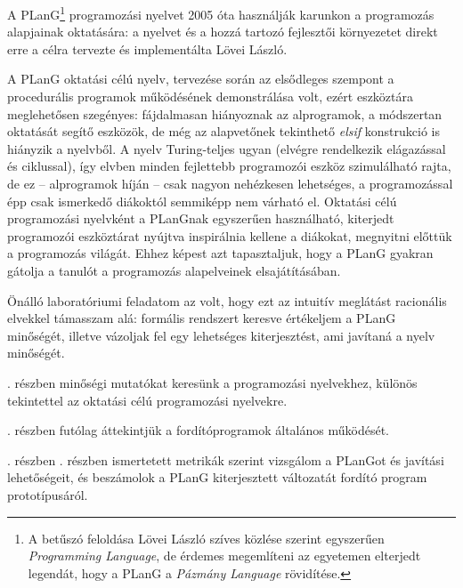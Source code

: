 

A PLanG\footnote{%
	A betűszó feloldása Lövei László szíves közlése szerint egyszerűen \textit{Programming Lan\-guage}, de érdemes megemlíteni az egyetemen elterjedt legendát, hogy a PLanG a \textit{Pázmány Language} rövidítése.}%
programozási nyelvet 2005 óta használják karunkon a programozás alapjainak oktatására: a nyelvet és a hozzá tartozó fejlesztői környezetet direkt erre a célra tervezte és implementálta Lövei László.

A PLanG oktatási célú nyelv, tervezése során az elsődleges szempont a procedurális programok működésének demonstrálása volt\cite{lovei}, ezért eszköztára meglehetősen szegényes: fájdalmasan hiányoznak az alprogramok, a módszertan oktatását segítő eszközök, de még az alapvetőnek tekinthető \textit{elsif} kon\-strukció is hiányzik a nyelvből.
A nyelv Turing-teljes ugyan (elvégre rendelkezik elágazással és ciklussal), így elvben minden fejlettebb programozói eszköz szimulálható rajta, de ez -- alprogramok híján -- csak nagyon nehézkesen lehetséges, a programozással épp csak ismerkedő diákoktól semmiképp nem várható el.
Oktatási célú programozási nyelvként a PLanGnak egyszerűen használható, kiterjedt programozói eszköztárat nyújtva inspirálnia kellene a diákokat, megnyitni előttük a programozás világát.
Ehhez képest azt tapasztaljuk, hogy a PLanG gyakran gátolja a tanulót a programozás alapelveinek elsajátításában.

Önálló laboratóriumi feladatom az volt, hogy ezt az intuitív meglátást racionális elvekkel támasszam alá: formális rendszert keresve értékeljem a PLanG minőségét, illetve vázoljak fel egy lehetséges kiterjesztést, ami javítaná a nyelv minőségét.

. részben minőségi mutatókat keresünk a programozási nyelvekhez, különös tekintettel az oktatási célú programozási nyelvekre.

. részben futólag áttekintjük a fordítóprogramok általános működését.

. részben . részben ismertetett metrikák szerint vizsgálom a PLanGot és javítási lehetőségeit, és beszámolok a PLanG kiterjesztett változatát fordító program prototípusáról.
